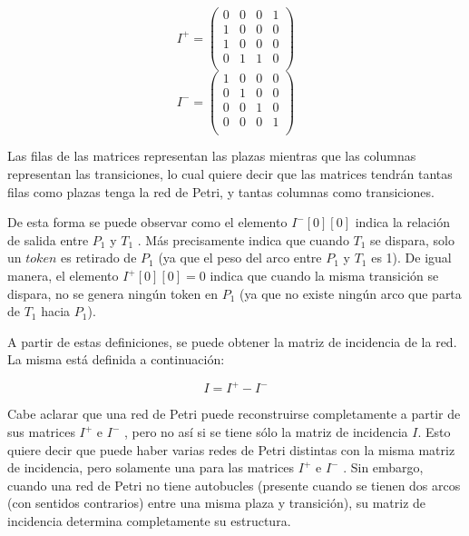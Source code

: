 \begin{equation}
    I^+ = 
    \begin{pmatrix}
        0 & 0 & 0 & 1 \\
        1 & 0 & 0 & 0 \\
        1 & 0 & 0 & 0 \\
        0 & 1 & 1 & 0 \\
    \end{pmatrix}
\end{equation}
\begin{equation}
    I^- = 
    \begin{pmatrix}
        1 & 0 & 0 & 0 \\
        0 & 1 & 0 & 0 \\
        0 & 0 & 1 & 0 \\
        0 & 0 & 0 & 1 \\
    \end{pmatrix}
\end{equation}

Las filas de las matrices representan las plazas mientras que las columnas representan las transiciones, lo cual quiere decir que las matrices tendrán tantas filas como plazas tenga la red de Petri, y tantas columnas como transiciones. \\ \par

De esta forma se puede observar como el elemento $I^-[0][0]$ indica la relación de salida entre $P_1$ y $T_1$ . Más precisamente indica que cuando $T_1$ se dispara, solo un $token$ es retirado de $P_1$ (ya que el peso del arco entre $P_1$ y $T_1$ es 1). De igual manera, el elemento $I^+[0][0] = 0$ indica que cuando la misma transición se dispara, no se genera ningún token en $P_1$ (ya que no existe ningún arco que parta de $T_1$ hacia $P_1$). \\ \par

A partir de estas definiciones, se puede obtener la matriz de incidencia de la red. La misma está definida a continuación:

\begin{equation}
    I = I^+ - I^-
\end{equation}

Cabe aclarar que una red de Petri puede reconstruirse completamente a partir de sus matrices $I^+$ e $I^-$ , pero no así si se tiene sólo la matriz de incidencia $I$. Esto quiere decir que puede haber varias redes de Petri distintas con la misma matriz de incidencia, pero solamente una para las matrices $I^+$ e $I^-$ . Sin embargo, cuando una red de Petri no tiene autobucles (presente cuando se tienen dos arcos (con sentidos contrarios) entre una misma plaza y transición), su matriz de incidencia determina completamente su estructura. \\ \par

